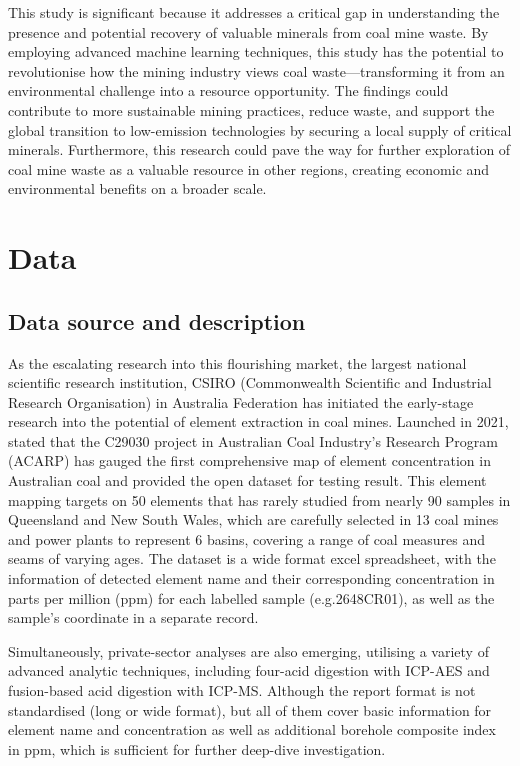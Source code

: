 \documentclass[11pt,a4paper,]{article}
\begin{document}
This study is significant because it addresses a critical gap in understanding the presence and potential recovery of valuable minerals from coal mine waste. By employing advanced machine learning techniques, this study has the potential to revolutionise how the mining industry views coal waste---transforming it from an environmental challenge into a resource opportunity. The findings could contribute to more sustainable mining practices, reduce waste, and support the global transition to low-emission technologies by securing a local supply of critical minerals. Furthermore, this research could pave the way for further exploration of coal mine waste as a valuable resource in other regions, creating economic and environmental benefits on a broader scale.

\section{Data}\label{data}

\subsection{Data source and description}\label{data-source-and-description}

As the escalating research into this flourishing market, the largest national scientific research institution, CSIRO (Commonwealth Scientific and Industrial Research Organisation) in Australia Federation has initiated the early-stage research into the potential of element extraction in coal mines. Launched in 2021, \autocite{Hodgkinson2021} stated that the C29030 project in Australian Coal Industry's Research Program (ACARP) has gauged the first comprehensive map of element concentration in Australian coal and provided the open dataset for testing result. This element mapping targets on 50 elements that has rarely studied from nearly 90 samples in Queensland and New South Wales, which are carefully selected in 13 coal mines and power plants to represent 6 basins, covering a range of coal measures and seams of varying ages. The dataset is a wide format excel spreadsheet, with the information of detected element name and their corresponding concentration in parts per million (ppm) for each labelled sample (e.g.2648CR01), as well as the sample's coordinate in a separate record.

Simultaneously, private-sector analyses are also emerging, utilising a variety of advanced analytic techniques, including four-acid digestion with ICP-AES and fusion-based acid digestion with ICP-MS. Although the report format is not standardised (long or wide format), but all of them cover basic information for element name and concentration as well as additional borehole composite index in ppm, which is sufficient for further deep-dive investigation.
\end{document}
